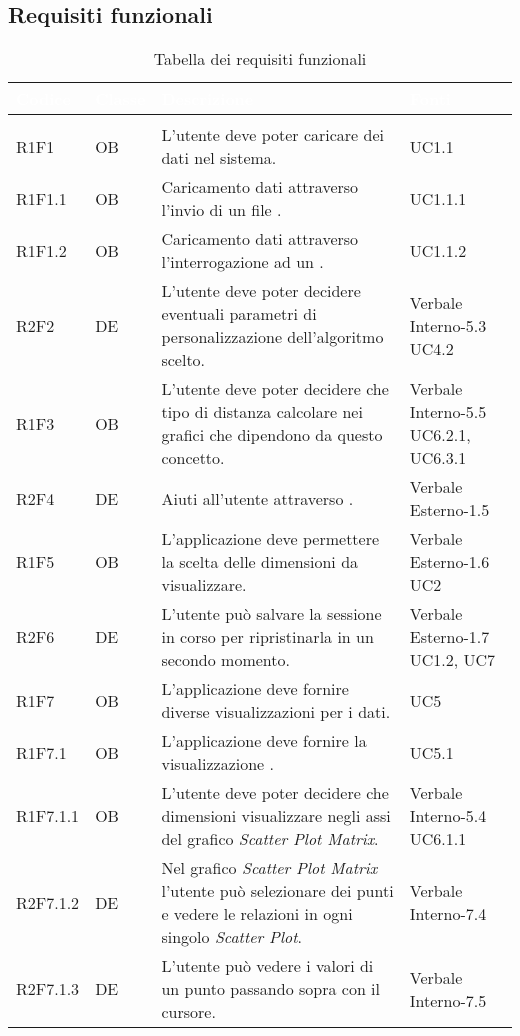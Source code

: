 \subsection{Requisiti funzionali}
\renewcommand{\arraystretch}{1.5}
{
\setlength\arrayrulewidth{1pt}
\begin{longtable}{C{2cm} | C{1.5cm} | C{9cm} | C{3.3cm}}
		\textcolor{white}{\textbf{Codice}} & 
		\textcolor{white}{\textbf{Classe}} & 
		\textcolor{white}{\textbf{Descrizione}} & 
		\textcolor{white}{\textbf{Fonti}} \\
		\endfirsthead
	    \\
	    \endfoot
	    \caption{Tabella dei requisiti funzionali}
	    \endlastfoot

R1F1 & OB & L'utente deve poter caricare dei dati nel sistema. & UC1.1\\
R1F1.1 & OB & Caricamento dati attraverso l'invio di un file . & UC1.1.1\\
R1F1.2 & OB & Caricamento dati attraverso l'interrogazione ad un . & UC1.1.2\\

R2F2 & DE & L'utente deve poter decidere eventuali parametri di personalizzazione dell'algoritmo scelto. & Verbale Interno-5.3 \newline UC4.2\\

R1F3 & OB & L'utente deve poter decidere che tipo di distanza calcolare nei grafici che dipendono da questo concetto. & Verbale Interno-5.5 \newline UC6.2.1, UC6.3.1\\

R2F4 & DE & Aiuti all'utente attraverso . & Verbale Esterno-1.5 \\
R1F5 & OB & L'applicazione deve permettere la scelta delle dimensioni da visualizzare. & Verbale Esterno-1.6 \newline UC2\\
R2F6 & DE & L'utente può salvare la sessione in corso per ripristinarla in un secondo momento. & Verbale Esterno-1.7 \newline UC1.2, UC7\\
R1F7 & OB & L'applicazione deve fornire diverse visualizzazioni per i dati. & UC5\\
R1F7.1 & OB & L'applicazione deve fornire la visualizzazione . & UC5.1\\
R1F7.1.1 & OB & L'utente deve poter decidere che dimensioni visualizzare negli assi del grafico \textit{Scatter Plot Matrix}. & Verbale Interno-5.4 \newline UC6.1.1\\
R2F7.1.2 & DE & Nel grafico \textit{Scatter Plot Matrix} l'utente può selezionare dei punti e vedere le relazioni in ogni singolo \textit{Scatter Plot}. & Verbale Interno-7.4\\
R2F7.1.3 & DE & L'utente può vedere i valori di un punto passando sopra con il cursore. & Verbale Interno-7.5\\


\end{longtable}}
